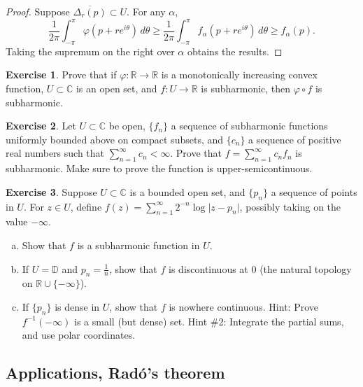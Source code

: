 \documentclass[12pt,openany]{book}
\newcommand{\sabs}[1]{\lvert {#1} \rvert}
\newcommand{\C}{{\mathbb{C}}}
\newcommand{\R}{{\mathbb{R}}}
\newcommand{\D}{{\mathbb{D}}}
\theoremstyle{plain}
\theoremstyle{remark}
\theoremstyle{definition}
\newenvironment{exbox}{%
    \def\FrameCommand{\vrule width 1pt \relax\hspace{10pt}}%
    \MakeFramed{\advance\hsize-\width\FrameRestore}%
}{%
    \endMakeFramed
}
\newenvironment{exparts}{%
    \leavevmode\begin{enumerate}[a),noitemsep,topsep=0pt,parsep=0pt,partopsep=0pt]
}{%
    \end{enumerate}
}
\theoremstyle{exercise}
\newtheorem{exercise}{Exercise}[section]
\theoremstyle{example}
\begin{document}
\begin{proof}
Suppose $\overline{\Delta_r(p)} \subset U$.  For any $\alpha$,
\begin{equation*}
\frac{1}{2\pi} \int_{-\pi}^{\pi} \varphi (p+re^{i\theta})\, d\theta 
\geq
\frac{1}{2\pi} \int_{-\pi}^{\pi} f_\alpha (p+re^{i\theta})\, d\theta 
\geq f_\alpha(p) .
\end{equation*}
Taking the supremum on the right over $\alpha$ obtains the results.
\end{proof}

\begin{exbox}
\begin{exercise}
Prove that if $\varphi \colon \R \to \R$ is a monotonically increasing
convex function, $U \subset \C$ is an open set, and $f \colon U \to \R$
is subharmonic, then $\varphi \circ f$ is subharmonic.
\end{exercise}

\begin{exercise}
Let $U \subset \C$ be open, $\{ f_n \}$ a sequence of 
subharmonic functions uniformly bounded above on compact subsets, and 
$\{ c_n \}$ a sequence of positive real numbers such that
$\sum_{n=1}^\infty c_n < \infty$.
Prove that $f = \sum_{n=1}^\infty c_n f_n$ is subharmonic.  Make sure to prove
the function is upper-semicontinuous.
\end{exercise}

\begin{exercise}
Suppose $U \subset \C$ is a bounded open set, and $\{ p_n \}$ a sequence of points in
$U$. For $z \in U$, define
$f(z) = \sum_{n=1}^\infty 2^{-n} \log \sabs{z-p_n}$, possibly taking on the
value $-\infty$.
\begin{exparts}
\item
Show that $f$ is a subharmonic function in $U$.
\item
If $U = \D$ and $p_n = \frac{1}{n}$, show that $f$ is discontinuous at $0$
(the natural topology on $\R \cup \{ -\infty \}$).
\item
If $\{ p_n \}$ is dense in $U$, show that $f$ 
is nowhere continuous.
Hint: Prove $f^{-1}(-\infty)$ is a small (but dense) set.
Hint \#2: Integrate the partial sums, and use polar coordinates.
\end{exparts}
\end{exercise}
\end{exbox}

\subsection{Applications, Rad\'o's theorem}
\end{document}
